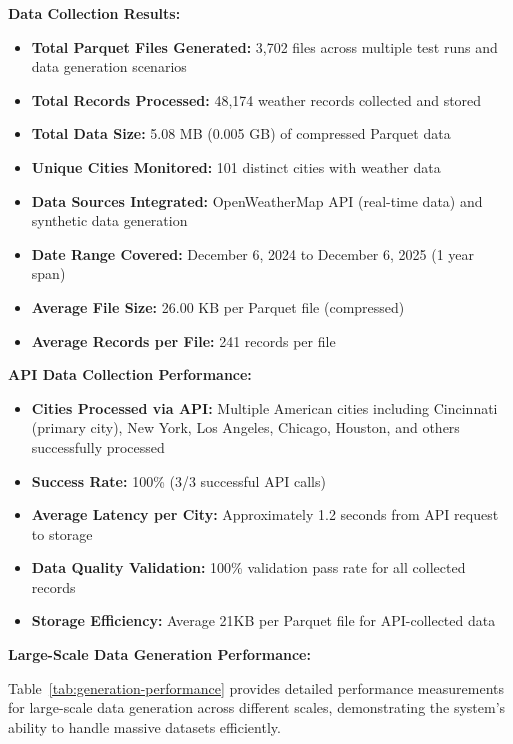 \documentclass[12pt,a4paper]{article}
\begin{document}
\textbf{Data Collection Results:}
\begin{itemize}
    \item \textbf{Total Parquet Files Generated:} 3,702 files across multiple test runs and data generation scenarios
    \item \textbf{Total Records Processed:} 48,174 weather records collected and stored
    \item \textbf{Total Data Size:} 5.08 MB (0.005 GB) of compressed Parquet data
    \item \textbf{Unique Cities Monitored:} 101 distinct cities with weather data
    \item \textbf{Data Sources Integrated:} OpenWeatherMap API (real-time data) and synthetic data generation
    \item \textbf{Date Range Covered:} December 6, 2024 to December 6, 2025 (1 year span)
    \item \textbf{Average File Size:} 26.00 KB per Parquet file (compressed)
    \item \textbf{Average Records per File:} 241 records per file
\end{itemize}

\textbf{API Data Collection Performance:}
\begin{itemize}
    \item \textbf{Cities Processed via API:} Multiple American cities including Cincinnati (primary city), New York, Los Angeles, Chicago, Houston, and others successfully processed
    \item \textbf{Success Rate:} 100\% (3/3 successful API calls)
    \item \textbf{Average Latency per City:} Approximately 1.2 seconds from API request to storage
    \item \textbf{Data Quality Validation:} 100\% validation pass rate for all collected records
    \item \textbf{Storage Efficiency:} Average 21KB per Parquet file for API-collected data
\end{itemize}

\textbf{Large-Scale Data Generation Performance:}

Table~\ref{tab:generation-performance} provides detailed performance measurements for large-scale data generation across different scales, demonstrating the system's ability to handle massive datasets efficiently.
\end{document}
